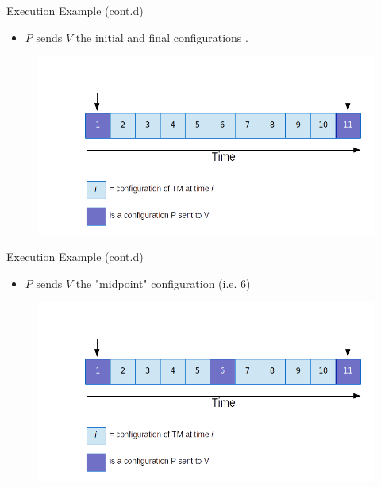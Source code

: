 \begin{frame}{Execution Example (cont.d)}
	\begin{itemize}
		\item $P$ sends $V$ the initial and final configurations .
	\end{itemize}
	\begin{figure}
		\includegraphics[scale=0.4]{pics/r1.png}
	\end{figure}
\end{frame}

\begin{frame}{Execution Example (cont.d)}
	
	\begin{itemize}
		\item $P$ sends $V$ the "midpoint" configuration (i.e. 6)
	\end{itemize}
	\begin{figure}
		\includegraphics[scale=0.4]{pics/r2.png}
	\end{figure}
	
\end{frame}


